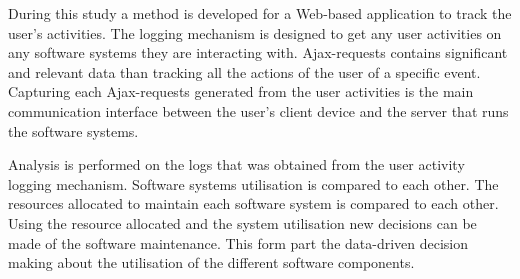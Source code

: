 During this study a method is developed for a Web-based application to track the
user's activities. The logging mechanism is designed to get any user activities
on any software systems they are interacting with. Ajax-requests contains
significant and relevant data than tracking all the actions of the user of a
specific event. Capturing each Ajax-requests generated from the user activities
is the main communication interface between the user's client device and the
server that runs the software systems.

Analysis is performed on the logs that was obtained from the user activity
logging mechanism. Software systems utilisation is compared to each other. The
resources allocated to maintain each software system is compared to each other.
Using the resource allocated and the system utilisation new decisions can be
made of the software maintenance. This form part the data-driven decision making
about the utilisation of the different software components.
